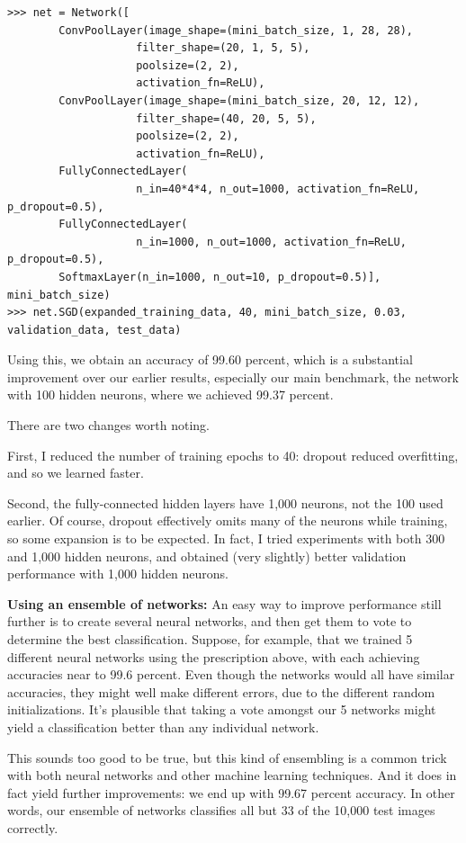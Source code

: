 \documentclass[a4paper,twoside,10pt]{book}
\begin{document}
\begin{lstlisting}
>>> net = Network([
		ConvPoolLayer(image_shape=(mini_batch_size, 1, 28, 28), 
					filter_shape=(20, 1, 5, 5), 
					poolsize=(2, 2), 
					activation_fn=ReLU),
		ConvPoolLayer(image_shape=(mini_batch_size, 20, 12, 12), 
					filter_shape=(40, 20, 5, 5), 
					poolsize=(2, 2), 
					activation_fn=ReLU),
		FullyConnectedLayer(
					n_in=40*4*4, n_out=1000, activation_fn=ReLU, p_dropout=0.5),
		FullyConnectedLayer(
					n_in=1000, n_out=1000, activation_fn=ReLU, p_dropout=0.5),
		SoftmaxLayer(n_in=1000, n_out=10, p_dropout=0.5)], 
mini_batch_size)
>>> net.SGD(expanded_training_data, 40, mini_batch_size, 0.03, 
validation_data, test_data)

\end{lstlisting}
Using this, we obtain an accuracy of 99.60 percent, which is a substantial improvement over our earlier results, especially our main benchmark, the network with 100 hidden neurons, where we achieved 99.37 percent.

There are two changes worth noting.

First, I reduced the number of training epochs to 40: dropout reduced overfitting, and so we learned faster.

Second, the fully-connected hidden layers have 1,000 neurons, not the 100 used earlier. Of course, dropout effectively omits many of the neurons while training, so some expansion is to be expected. In fact, I tried experiments with both 300 and 1,000 hidden neurons, and obtained (very slightly) better validation performance with 1,000 hidden neurons.

\textbf{Using an ensemble of networks:} An easy way to improve performance still further is to create several neural networks, and then get them to vote to determine the best classification. Suppose, for example, that we trained 5 different neural networks using the prescription above, with each achieving accuracies near to 99.6 percent. Even though the networks would all have similar accuracies, they might well make different errors, due to the different random initializations. It's plausible that taking a vote amongst our 5 networks might yield a classification better than any individual network.

This sounds too good to be true, but this kind of ensembling is a common trick with both neural networks and other machine learning techniques. And it does in fact yield further improvements: we end up with 99.67 percent accuracy. In other words, our ensemble of networks classifies all but 33 of the 10,000 test images correctly.
\end{document}
